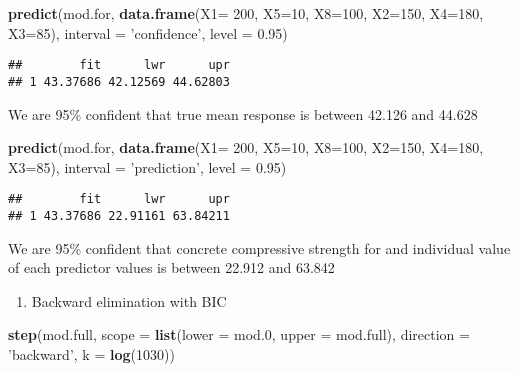 \documentclass[]{article}
\newenvironment{Shaded}{\begin{snugshade}}{\end{snugshade}}
\newcommand{\KeywordTok}[1]{\textcolor[rgb]{0.13,0.29,0.53}{\textbf{#1}}}
\newcommand{\DataTypeTok}[1]{\textcolor[rgb]{0.13,0.29,0.53}{#1}}
\newcommand{\DecValTok}[1]{\textcolor[rgb]{0.00,0.00,0.81}{#1}}
\newcommand{\FloatTok}[1]{\textcolor[rgb]{0.00,0.00,0.81}{#1}}
\newcommand{\StringTok}[1]{\textcolor[rgb]{0.31,0.60,0.02}{#1}}
\newcommand{\NormalTok}[1]{#1}
\providecommand{\tightlist}{%
  \setlength{\itemsep}{0pt}\setlength{\parskip}{0pt}}
\begin{document}
\begin{Shaded}
\begin{Highlighting}[]
\KeywordTok{predict}\NormalTok{(mod.for, }\KeywordTok{data.frame}\NormalTok{(}\DataTypeTok{X1=} \DecValTok{200}\NormalTok{, }\DataTypeTok{X5=}\DecValTok{10}\NormalTok{, }\DataTypeTok{X8=}\DecValTok{100}\NormalTok{, }\DataTypeTok{X2=}\DecValTok{150}\NormalTok{, }\DataTypeTok{X4=}\DecValTok{180}\NormalTok{, }\DataTypeTok{X3=}\DecValTok{85}\NormalTok{),}
\DataTypeTok{interval =} \StringTok{'confidence'}\NormalTok{, }\DataTypeTok{level =} \FloatTok{0.95}\NormalTok{)}
\end{Highlighting}
\end{Shaded}

\begin{verbatim}
##        fit      lwr      upr
## 1 43.37686 42.12569 44.62803
\end{verbatim}

We are 95\% confident that true mean response is between 42.126 and
44.628

\begin{Shaded}
\begin{Highlighting}[]
\KeywordTok{predict}\NormalTok{(mod.for, }\KeywordTok{data.frame}\NormalTok{(}\DataTypeTok{X1=} \DecValTok{200}\NormalTok{, }\DataTypeTok{X5=}\DecValTok{10}\NormalTok{, }\DataTypeTok{X8=}\DecValTok{100}\NormalTok{, }\DataTypeTok{X2=}\DecValTok{150}\NormalTok{, }\DataTypeTok{X4=}\DecValTok{180}\NormalTok{, }\DataTypeTok{X3=}\DecValTok{85}\NormalTok{),}
\DataTypeTok{interval =} \StringTok{'prediction'}\NormalTok{, }\DataTypeTok{level =} \FloatTok{0.95}\NormalTok{)}
\end{Highlighting}
\end{Shaded}

\begin{verbatim}
##        fit      lwr      upr
## 1 43.37686 22.91161 63.84211
\end{verbatim}

We are 95\% confident that concrete compressive strength for and
individual value of each predictor values is between 22.912 and 63.842

\begin{enumerate}
\def\labelenumi{(\alph{enumi})}
\setcounter{enumi}{1}
\tightlist
\item
  Backward elimination with BIC
\end{enumerate}

\begin{Shaded}
\begin{Highlighting}[]
\KeywordTok{step}\NormalTok{(mod.full, }\DataTypeTok{scope =} \KeywordTok{list}\NormalTok{(}\DataTypeTok{lower =}\NormalTok{ mod.}\DecValTok{0}\NormalTok{, }\DataTypeTok{upper =}\NormalTok{ mod.full), }\DataTypeTok{direction =} \StringTok{'backward'}\NormalTok{, }\DataTypeTok{k =} \KeywordTok{log}\NormalTok{(}\DecValTok{1030}\NormalTok{))}
\end{Highlighting}
\end{Shaded}
\end{document}

